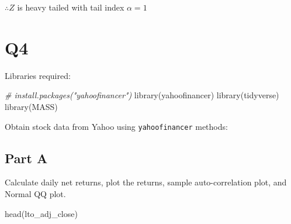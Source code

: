 \documentclass[
  oneside]{book}
\newenvironment{Shaded}{\begin{snugshade}}{\end{snugshade}}
\newcommand{\AttributeTok}[1]{\textcolor[rgb]{0.77,0.63,0.00}{#1}}
\newcommand{\CommentTok}[1]{\textcolor[rgb]{0.56,0.35,0.01}{\textit{#1}}}
\newcommand{\FunctionTok}[1]{\textcolor[rgb]{0.00,0.00,0.00}{#1}}
\newcommand{\NormalTok}[1]{#1}
\newcommand{\OtherTok}[1]{\textcolor[rgb]{0.56,0.35,0.01}{#1}}
\newcommand{\SpecialCharTok}[1]{\textcolor[rgb]{0.00,0.00,0.00}{#1}}
\newcommand{\StringTok}[1]{\textcolor[rgb]{0.31,0.60,0.02}{#1}}
\begin{document}
\(\therefore Z\) is heavy tailed with tail index \(\alpha=1\)

\hypertarget{q4-1}{%
\section{Q4}\label{q4-1}}

Libraries required:

\begin{Shaded}
\begin{Highlighting}[]
\CommentTok{\# install.packages("yahoofinancer")}
\FunctionTok{library}\NormalTok{(yahoofinancer)}
\FunctionTok{library}\NormalTok{(tidyverse)}
\FunctionTok{library}\NormalTok{(MASS)}
\end{Highlighting}
\end{Shaded}

Obtain stock data from Yahoo using \texttt{yahoofinancer} methods:

\begin{Shaded}
\end{Shaded}

\hypertarget{part-a-1}{%
\subsection{Part A}\label{part-a-1}}

Calculate daily net returns, plot the returns, sample auto-correlation plot, and Normal QQ plot.

\begin{Shaded}
\begin{Highlighting}[]
\FunctionTok{head}\NormalTok{(lto\_adj\_close)}
\end{Highlighting}
\end{Shaded}
\end{document}
